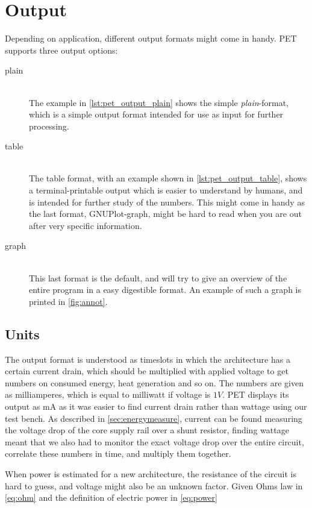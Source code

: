 \section{Output}
Depending on application, different output formats might come in handy. PET
supports three output options:

\begin{description}
    \item[plain]\hfill\\
        The example in \autoref{lst:pet_output_plain} shows the simple
        \emph{plain}-format, which is a simple output format intended for
        use as input for further processing.
    \item[table]\hfill\\
        The table format, with an example shown in \autoref{lst:pet_output_table},
        shows a terminal-printable output which is easier to understand by
        humans, and is intended for further study of the numbers. This might
        come in handy as the last format, GNUPlot-graph, might be hard to
        read when you are out after very specific information.
    \item[graph]\hfill\\
        This last format is the default, and will try to give an overview of
        the entire program in a easy digestible format. An example of such
        a graph is printed in \autoref{fig:annot}.
\end{description}

\subsection{Units}

The output format is understood as timeslots in which the architecture has a
certain current drain, which should be multiplied with applied voltage to get
numbers on consumed energy, heat generation and so on. The numbers are given as
milliamperes, which is equal to milliwatt if voltage is $1V$. PET displays its
output as mA as it was easier to find current drain rather than wattage using
our test bench. As described in \autoref{sec:energymeasure}, current can be
found measuring the voltage drop of the core supply rail over a shunt resistor,
finding wattage meant that we also had to monitor the exact voltage drop over
the entire circuit, correlate these numbers in time, and multiply them together.

When power is estimated for a new architecture, the resistance of the circuit is
hard to guess, and voltage might also be an unknown factor. Given Ohms law in
\autoref{eq:ohm} and the definition of electric power in \autoref{eq:power}

